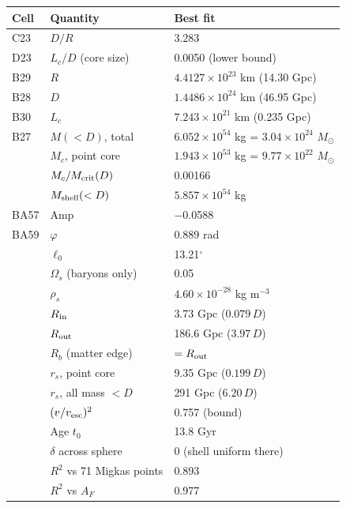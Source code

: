 \documentclass[10pt,letterpaper]{article}
\begin{document}
\begin{minipage}[t]{0.48\textwidth}\vspace{0pt}\centering\scriptsize\setlength{\tabcolsep}{2.5pt}\renewcommand{\arraystretch}{0.95}
\begin{tabular}{lll}\toprule
Cell & Quantity & Best fit\\\midrule
C23 & $D/R$ & 3.283\\
D23 & $L_c/D$ (core size) & 0.0050 (lower bound)\\
B29 & $R$ & $4.4127\times10^{23}$ km (14.30 Gpc)\\
B28 & $D$ & $1.4486\times10^{24}$ km (46.95 Gpc)\\
B30 & $L_c$ & $7.243\times10^{21}$ km (0.235 Gpc)\\
B27 & $M(<D)$, total & $6.052\times10^{54}$ kg = $3.04\times10^{24}$ $M_\odot$\\
 & $M_c$, point core & $1.943\times10^{53}$ kg = $9.77\times10^{22}$ $M_\odot$\\
 & $M_c/M_{\rm crit}(D)$ & 0.00166\\
 & $M_{\rm shell}(<D)$ & $5.857\times10^{54}$ kg\\
BA57 & Amp & $-$0.0588\\
BA59 & $\varphi$ & 0.889 rad\\
 & $\ell_0$ & 13.21$^\circ$\\\midrule
 & $\Omega_s$ (baryons only) & 0.05\\
 & $\rho_s$ & $4.60\times10^{-28}$ kg m$^{-3}$\\
 & $R_{\rm in}$ & 3.73 Gpc ($0.079\,D$)\\
 & $R_{\rm out}$ & 186.6 Gpc ($3.97\,D$)\\
 & $R_b$ (matter edge) & $=R_{\rm out}$\\
 & $r_s$, point core & 9.35 Gpc ($0.199\,D$)\\
 & $r_s$, all mass $<D$ & 291 Gpc ($6.20\,D$)\\\midrule
 & $(v/v_{\rm esc})^2$ & 0.757 (bound)\\
 & Age $t_0$ & 13.8 Gyr\\
 & $\delta$ across sphere & 0 (shell uniform there)\\
 & $R^2$ vs 71 Migkas points & 0.893\\
 & $R^2$ vs $A_F$ & 0.977\\\bottomrule
\end{tabular}
\end{minipage}
\end{document}
